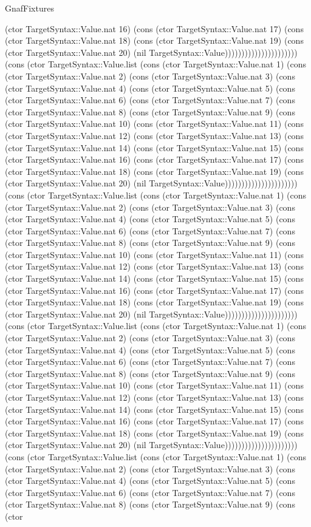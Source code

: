 \begin{lexlean}{GnafFixtures}
\begin{semanticmodule}
{(ctor TargetSyntax::Value.nat 16) (cons (ctor TargetSyntax::Value.nat 17) (cons (ctor TargetSyntax::Value.nat 18) (cons (ctor TargetSyntax::Value.nat 19) (cons (ctor TargetSyntax::Value.nat 20) (nil TargetSyntax::Value)))))))))))))))))))))) (cons (ctor TargetSyntax::Value.list (cons (ctor TargetSyntax::Value.nat 1) (cons (ctor TargetSyntax::Value.nat 2) (cons (ctor TargetSyntax::Value.nat 3) (cons (ctor TargetSyntax::Value.nat 4) (cons (ctor TargetSyntax::Value.nat 5) (cons (ctor TargetSyntax::Value.nat 6) (cons (ctor TargetSyntax::Value.nat 7) (cons (ctor TargetSyntax::Value.nat 8) (cons (ctor TargetSyntax::Value.nat 9) (cons (ctor TargetSyntax::Value.nat 10) (cons (ctor TargetSyntax::Value.nat 11) (cons (ctor TargetSyntax::Value.nat 12) (cons (ctor TargetSyntax::Value.nat 13) (cons (ctor TargetSyntax::Value.nat 14) (cons (ctor TargetSyntax::Value.nat 15) (cons (ctor TargetSyntax::Value.nat 16) (cons (ctor TargetSyntax::Value.nat 17) (cons (ctor TargetSyntax::Value.nat 18) (cons (ctor TargetSyntax::Value.nat 19) (cons (ctor TargetSyntax::Value.nat 20) (nil TargetSyntax::Value)))))))))))))))))))))) (cons (ctor TargetSyntax::Value.list (cons (ctor TargetSyntax::Value.nat 1) (cons (ctor TargetSyntax::Value.nat 2) (cons (ctor TargetSyntax::Value.nat 3) (cons (ctor TargetSyntax::Value.nat 4) (cons (ctor TargetSyntax::Value.nat 5) (cons (ctor TargetSyntax::Value.nat 6) (cons (ctor TargetSyntax::Value.nat 7) (cons (ctor TargetSyntax::Value.nat 8) (cons (ctor TargetSyntax::Value.nat 9) (cons (ctor TargetSyntax::Value.nat 10) (cons (ctor TargetSyntax::Value.nat 11) (cons (ctor TargetSyntax::Value.nat 12) (cons (ctor TargetSyntax::Value.nat 13) (cons (ctor TargetSyntax::Value.nat 14) (cons (ctor TargetSyntax::Value.nat 15) (cons (ctor TargetSyntax::Value.nat 16) (cons (ctor TargetSyntax::Value.nat 17) (cons (ctor TargetSyntax::Value.nat 18) (cons (ctor TargetSyntax::Value.nat 19) (cons (ctor TargetSyntax::Value.nat 20) (nil TargetSyntax::Value)))))))))))))))))))))) (cons (ctor TargetSyntax::Value.list (cons (ctor TargetSyntax::Value.nat 1) (cons (ctor TargetSyntax::Value.nat 2) (cons (ctor TargetSyntax::Value.nat 3) (cons (ctor TargetSyntax::Value.nat 4) (cons (ctor TargetSyntax::Value.nat 5) (cons (ctor TargetSyntax::Value.nat 6) (cons (ctor TargetSyntax::Value.nat 7) (cons (ctor TargetSyntax::Value.nat 8) (cons (ctor TargetSyntax::Value.nat 9) (cons (ctor TargetSyntax::Value.nat 10) (cons (ctor TargetSyntax::Value.nat 11) (cons (ctor TargetSyntax::Value.nat 12) (cons (ctor TargetSyntax::Value.nat 13) (cons (ctor TargetSyntax::Value.nat 14) (cons (ctor TargetSyntax::Value.nat 15) (cons (ctor TargetSyntax::Value.nat 16) (cons (ctor TargetSyntax::Value.nat 17) (cons (ctor TargetSyntax::Value.nat 18) (cons (ctor TargetSyntax::Value.nat 19) (cons (ctor TargetSyntax::Value.nat 20) (nil TargetSyntax::Value)))))))))))))))))))))) (cons (ctor TargetSyntax::Value.list (cons (ctor TargetSyntax::Value.nat 1) (cons (ctor TargetSyntax::Value.nat 2) (cons (ctor TargetSyntax::Value.nat 3) (cons (ctor TargetSyntax::Value.nat 4) (cons (ctor TargetSyntax::Value.nat 5) (cons (ctor TargetSyntax::Value.nat 6) (cons (ctor TargetSyntax::Value.nat 7) (cons (ctor TargetSyntax::Value.nat 8) (cons (ctor TargetSyntax::Value.nat 9) (cons (ctor }
\end{semanticmodule}
\end{lexlean}

